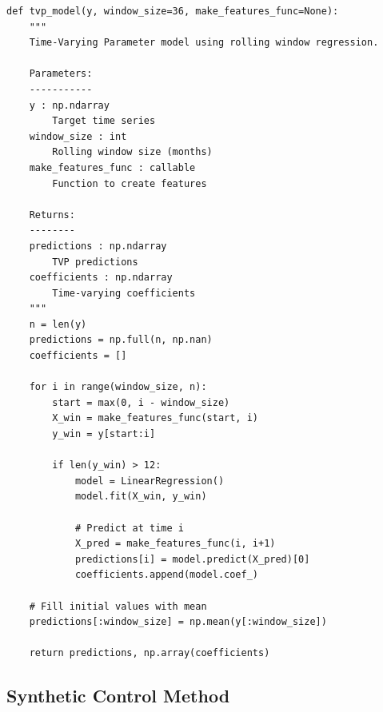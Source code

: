 \documentclass[12pt,a4paper,twocolumn]{article}
\begin{document}
\begin{lstlisting}[caption={TVP Model with Rolling Window}, label=lst:tvp]
def tvp_model(y, window_size=36, make_features_func=None):
    """
    Time-Varying Parameter model using rolling window regression.
    
    Parameters:
    -----------
    y : np.ndarray
        Target time series
    window_size : int
        Rolling window size (months)
    make_features_func : callable
        Function to create features
    
    Returns:
    --------
    predictions : np.ndarray
        TVP predictions
    coefficients : np.ndarray
        Time-varying coefficients
    """
    n = len(y)
    predictions = np.full(n, np.nan)
    coefficients = []
    
    for i in range(window_size, n):
        start = max(0, i - window_size)
        X_win = make_features_func(start, i)
        y_win = y[start:i]
        
        if len(y_win) > 12:
            model = LinearRegression()
            model.fit(X_win, y_win)
            
            # Predict at time i
            X_pred = make_features_func(i, i+1)
            predictions[i] = model.predict(X_pred)[0]
            coefficients.append(model.coef_)
    
    # Fill initial values with mean
    predictions[:window_size] = np.mean(y[:window_size])
    
    return predictions, np.array(coefficients)
\end{lstlisting}

\subsection{Synthetic Control Method}
\end{document}

